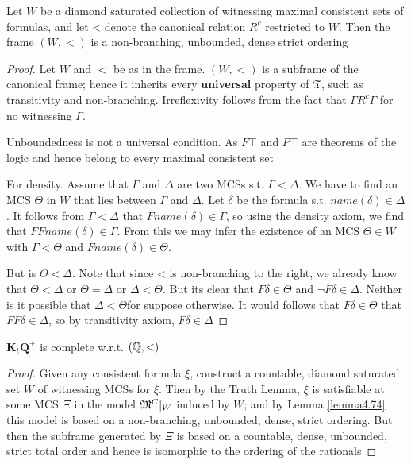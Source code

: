 \documentclass[11pt]{article}
\newcommand{\KtQ}{\textbf{K}_t\textbf{Q}}
\begin{document}
\begin{lemma}[]
\label{lemma4.74}
Let \(W\) be a diamond saturated collection of witnessing maximal consistent
sets of formulas, and let < denote the canonical relation \(R^c\) restricted
to \(W\). Then the frame \((W,<)\) is a non-branching, unbounded, dense
strict ordering
\end{lemma}

\begin{proof}
Let \(W\) and \(<\) be as in the frame. \((W,<)\) is a subframe of the
canonical frame; hence it inherits every \textbf{universal} property of \(\mathfrak{T}\), such
as transitivity and non-branching. Irreflexivity follows from the fact that
\(\Gamma R^c\Gamma\) for no witnessing \(\Gamma\).

Unboundedness is not a universal condition. As \(F\top\) and \(P\top\) are
theorems of the logic and hence belong to every maximal consistent set

For density. Assume that \(\Gamma\) and \(\Delta\) are two MCSs s.t. \(\Gamma<\Delta\). We have to
find an MCS \(\Theta\) in \(W\) that lies between \(\Gamma\) and \(\Delta\). Let \(\delta\) be the formula s.t.
\(name(\delta)\in\Delta\). It follows from \(\Gamma<\Delta\) that
\(Fname(\delta)\in\Gamma\), so using the density axiom, we find that
\(FFname(\delta)\in\Gamma\). From this we may infer the existence of an MCS
\(\Theta\in W\) with \(\Gamma<\Theta\) and \(Fname(\delta)\in\Theta\).

But is \(\Theta<\Delta\). Note that since < is non-branching to the right, we
already know that \(\Theta<\Delta\) or \(\Theta=\Delta\) or \(\Delta<\Theta\). But its
clear that \(F\delta\in\Theta\) and \(\neg F\delta\in\Delta\). Neither is it
possible that \(\Delta<\Theta\)for suppose otherwise. It would follows that
\(F\delta\in\Theta\) that \(FF\delta\in\Delta\), so by transitivity axiom, \(F\delta\in\Delta\)
\end{proof}

\begin{theorem}[]
\(\KtQ^+\) is complete w.r.t. \((\mathbb{Q},<)\)
\end{theorem}

\begin{proof}
Given any consistent formula \(\xi\), construct a countable, diamond saturated set
\(W\) of witnessing MCSs for \(\xi\). Then by the Truth Lemma, \(\xi\) is satisfiable at
some MCS \(\Xi\) in the model \(\mathfrak{M}^C\vert_W\) induced by \(W\); and by Lemma
\ref{lemma4.74} this model is based on a non-branching, unbounded, dense,
strict ordering. But then the subframe generated by \(\Xi\) is based on a
countable, dense, unbounded, strict total order and hence is isomorphic to
the ordering of the rationals
\end{proof}
\end{document}
